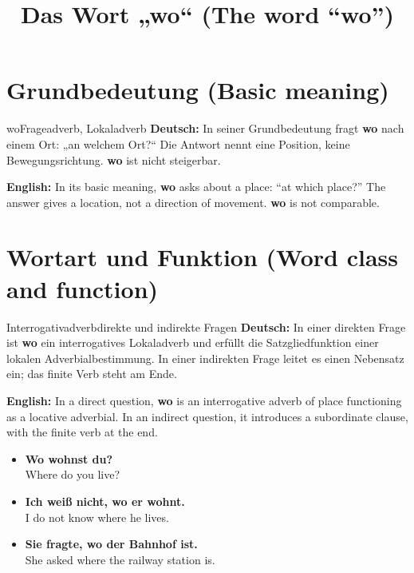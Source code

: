 \documentclass[a4paper,11pt]{article}
\title{Das Wort „wo“ (The word “wo”)}
\date{}
\newcommand{\GermanText}[1]{\textbf{Deutsch: }#1\par}
\newcommand{\EnglishText}[1]{{\small\color{SoftGray}\textbf{English: }#1\par}}
\newcommand{\ExampleItem}[2]{\item \textbf{#1}\\{\small\color{SoftGray}#2}}
\begin{document}
\maketitle
\tableofcontents
\newpage
\section{Grundbedeutung (Basic meaning)}
\begin{grammarentry}{wo}{Frageadverb, Lokaladverb}
\GermanText{In seiner Grundbedeutung fragt \textbf{wo} nach einem Ort: „an welchem Ort?“ Die Antwort nennt eine Position, keine Bewegungsrichtung. \textbf{wo} ist nicht steigerbar.}
\EnglishText{In its basic meaning, \textbf{wo} asks about a place: “at which place?” The answer gives a location, not a direction of movement. \textbf{wo} is not comparable.}
\end{grammarentry}

\section{Wortart und Funktion (Word class and function)}
\begin{grammarentry}{Interrogativadverb}{direkte und indirekte Fragen}
\GermanText{In einer direkten Frage ist \textbf{wo} ein interrogatives Lokaladverb und erfüllt die Satzgliedfunktion einer lokalen Adverbialbestimmung. In einer indirekten Frage leitet es einen Nebensatz ein; das finite Verb steht am Ende.}
\EnglishText{In a direct question, \textbf{wo} is an interrogative adverb of place functioning as a locative adverbial. In an indirect question, it introduces a subordinate clause, with the finite verb at the end.}
\end{grammarentry}
\begin{exbox}\begin{itemize}
\ExampleItem{Wo wohnst du?}{Where do you live?}
\ExampleItem{Ich weiß nicht, wo er wohnt.}{I do not know where he lives.}
\ExampleItem{Sie fragte, wo der Bahnhof ist.}{She asked where the railway station is.}
\end{itemize}\end{exbox}
\end{document}
